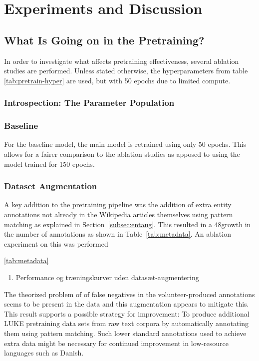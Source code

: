 \documentclass[main.tex]{subfiles}
\begin{document}
\chapter{Experiments and Discussion}

\section{What Is Going on in the Pretraining?}
In order to investigate what affects pretraining effectiveness, several ablation studies are performed.
Unless stated otherwise, the hyperparameters from table \ref{tab:pretrain-hyper} are used, but with 50 epochs due to limited compute.

\subsection{Introspection: The Parameter Population}

\subsection{Baseline}
For the baseline model, the main model is retrained using only 50 epochs.
This allows for a fairer comparison to the ablation studies as apposed to using the model trained for 150 epochs.

\subsection{Dataset Augmentation}
A key addition to the pretraining pipeline was the addition of extra entity annotations not already in the Wikipedia articles themselves using pattern matching as explained in Section~\ref{subsec:entaug}.
This resulted in a 48\pro growth in the number of annotations as shown in Table~\ref{tab:metadata}.
An ablation experiment on this was performed

\ref{tab:metadata}
\begin{enumerate}
    \item Performance og træningskurver uden datasæt-augmentering
\end{enumerate}

The theorized problem of of false negatives in the volunteer-produced annotations seems to be present in the data and this augmentation appears to mitigate this.
This result supports a possible strategy for improvement:
To produce additional LUKE pretraining data sets from raw text corpora by automatically annotating them using pattern matching.
Such lower standard annotations used to achieve extra data might be necessary for continued improvement in low-resource languages such as Danish.
\end{document}
